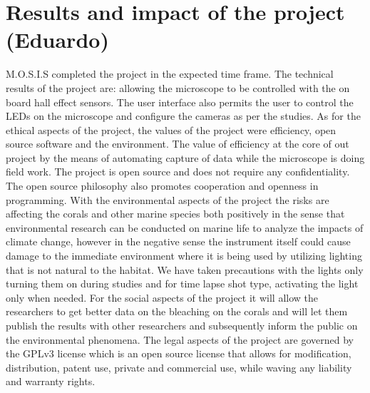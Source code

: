 \section{Results and impact of the project (Eduardo)}
M.O.S.I.S completed the project in the expected time frame. The technical results of the project are: allowing the microscope to be controlled with the on board hall effect sensors. The user interface also permits the user to control the LEDs on the microscope and configure the cameras as per the studies. As for the ethical aspects of the project, the values of the project were efficiency, open source software and the environment. The value of efficiency at the core of out project by the means of automating capture of data while the microscope is doing field work.  The project is open source and does not require any confidentiality. The open source philosophy also promotes cooperation and openness in programming.  With the environmental aspects of the project the risks are affecting the corals and other marine species both positively in the sense that environmental research can be conducted on marine life to analyze the impacts of climate change, however in the negative sense the instrument itself could cause damage to the immediate environment where it is being used by utilizing lighting that is not natural to the habitat. We have taken precautions with the lights only turning them on during studies and for time lapse shot type, activating the light only when needed. For the social aspects of the project it will allow the researchers to get better data on the bleaching on the corals and will let them publish the results with other researchers and subsequently inform the public on the environmental phenomena. The legal aspects of the project are governed by the GPLv3 license which is an open source license that allows for modification, distribution, patent use, private and commercial use, while waving any liability and warranty rights.